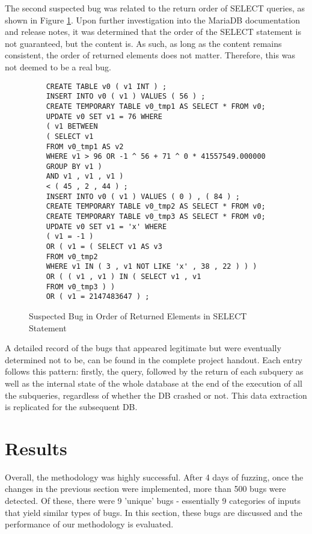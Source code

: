 \documentclass[sigconf]{acmart}
\begin{document}
The second suspected bug was related to the return order of SELECT queries, as shown in Figure \ref{fig:bug_order}. Upon further investigation into the MariaDB documentation and release notes, it was determined that the order of the SELECT statement is not guaranteed, but the content is. As such, as long as the content remains consistent, the order of returned elements does not matter. Therefore, this was not deemed to be a real bug.
\begin{figure}[h]
    \centering
    \begin{verbatim}
    CREATE TABLE v0 ( v1 INT ) ;
    INSERT INTO v0 ( v1 ) VALUES ( 56 ) ;
    CREATE TEMPORARY TABLE v0_tmp1 AS SELECT * FROM v0;
    UPDATE v0 SET v1 = 76 WHERE
    ( v1 BETWEEN
    ( SELECT v1
    FROM v0_tmp1 AS v2
    WHERE v1 > 96 OR -1 ^ 56 + 71 ^ 0 * 41557549.000000
    GROUP BY v1 )
    AND v1 , v1 , v1 )
    < ( 45 , 2 , 44 ) ;
    INSERT INTO v0 ( v1 ) VALUES ( 0 ) , ( 84 ) ;
    CREATE TEMPORARY TABLE v0_tmp2 AS SELECT * FROM v0;
    CREATE TEMPORARY TABLE v0_tmp3 AS SELECT * FROM v0;
    UPDATE v0 SET v1 = 'x' WHERE
    ( v1 = -1 )
    OR ( v1 = ( SELECT v1 AS v3
    FROM v0_tmp2
    WHERE v1 IN ( 3 , v1 NOT LIKE 'x' , 38 , 22 ) ) )
    OR ( ( v1 , v1 ) IN ( SELECT v1 , v1
    FROM v0_tmp3 ) )
    OR ( v1 = 2147483647 ) ;
    \end{verbatim}
    \caption{Suspected Bug in Order of Returned Elements in SELECT Statement}
    \label{fig:bug_order}
    \end{figure}
A detailed record of the bugs that appeared legitimate but were eventually determined not to be, can be found in the complete project handout. Each entry follows this pattern: firstly, the query, followed by the return of each subquery as well as the internal state of the whole database at the end of the execution of all the subqueries, regardless of whether the DB crashed or not. This data extraction is replicated for the subsequent DB.

\section{Results}
Overall, the methodology was highly successful. After 4 days of fuzzing, once the changes in the previous section were implemented, more than 500 bugs were detected. Of these, there were 9 'unique' bugs - essentially 9 categories of inputs that yield similar types of bugs. In this section, these bugs are discussed and the performance of our methodology is evaluated.
\end{document}
